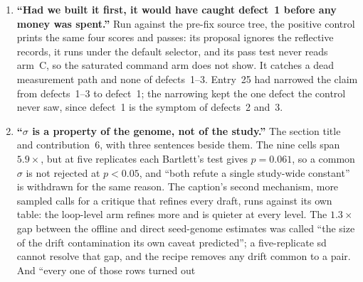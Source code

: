 \documentclass[11pt]{article}
\begin{document}
\begin{enumerate}
    stated for all fifteen runs. A full replay at the pre-fix commit, released with this revision,
    reproduces twelve of the thirteen runs that made the gene evolvable, score for score; in ten
    the critique gene is unchanged on every seed, and in run~6 and the nano worker swap arm~D's
    winner rewrote it on one seed each. The thirteenth, on BigCodeBench, cannot replay. Four of the
    twelve gate on the true metric, where the gene is inert, which the original count also folded
    in without saying. The same sentence's companions go with it: ``no $\dd$ in the table measures
    the treatment'' now excepts run~6's third seed, and ``the superseded cassettes cannot be
    re-run'' now says where they can. The diagnosis stands, and so does the flagship's $0/15$; the
    count of runs was an extrapolation stated as a measurement, the error this paper is about,
    and it survived because the checker pinned the figure as a literal and listed its source as
    verified by hand. The counts are now derived from the released replay record.
  \item \textbf{``Had we built it first, it would have caught defect~1 before any money was
    spent.''} Run against the pre-fix source tree, the positive control prints the same four scores
    and passes: its proposal ignores the reflective records, it runs under the default selector,
    and its pass test never reads arm~C, so the saturated command arm does not show. It catches a
    dead measurement path and none of defects~1--3. Entry~25 had narrowed the claim from
    defects~1--3 to defect~1; the narrowing kept the one defect the control never saw, since
    defect~1 is the symptom of defects~2 and~3.
  \item \textbf{``$\sigma$ is a property of the genome, not of the study.''} The section title and
    contribution~6, with three sentences beside them. The nine cells span $5.9\times$, but at five
    replicates each Bartlett's test gives $p = 0.061$, so a common $\sigma$ is not rejected at
    $p<0.05$, and ``both refute a single study-wide constant'' is withdrawn for the same reason.
    The caption's second mechanism, more sampled calls for a critique that refines every draft,
    runs against its own table: the loop-level arm refines more and is quieter at every level. The
    $1.3\times$ gap between the offline and direct seed-genome estimates was called ``the size of
    the drift contamination its own caveat predicted''; a five-replicate sd cannot resolve that
    gap, and the recipe removes any drift common to a pair. And ``every one of those rows turned out

\end{enumerate}
\end{document}
